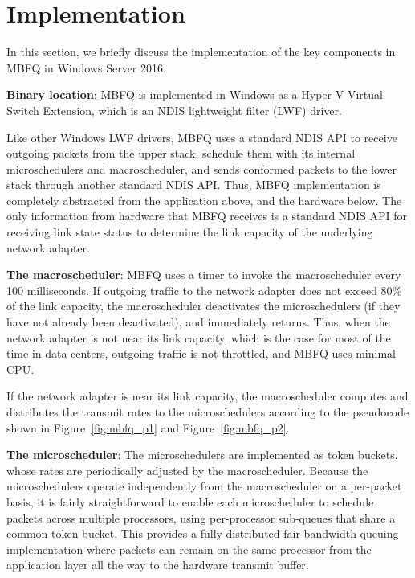 \section{Implementation}
\label{sec:implementation}
In this section, we briefly discuss the implementation of the key components in MBFQ in Windows
Server 2016.

{\bf Binary location}: MBFQ is implemented in Windows as a Hyper-V Virtual Switch Extension, 
which is an NDIS lightweight filter (LWF) driver.

Like other Windows LWF drivers, MBFQ uses a standard NDIS API to receive outgoing packets
from the upper stack, schedule them with its internal microschedulers and macroscheduler, and 
sends conformed packets to the lower stack through another standard NDIS API.
Thus, MBFQ implementation is completely abstracted from the application above, and the 
hardware below.  The only information from hardware that MBFQ receives is a standard NDIS API 
for receiving link state status to determine the link capacity of the underlying network adapter.

{\bf The macroscheduler}: MBFQ uses a timer to invoke the macroscheduler every 100 milliseconds.
If outgoing traffic to the network adapter does not exceed 80\% of the link capacity, the
macroscheduler deactivates the microschedulers (if they have not already been deactivated), and
immediately returns.  Thus, when the network adapter is not near its link capacity, which is the case
for most of the time in data centers, outgoing traffic is not throttled, and MBFQ uses minimal CPU.

If the network adapter is near its link capacity, the macroscheduler computes and distributes the
transmit rates to the microschedulers according to the pseudocode shown in  
Figure~\ref{fig:mbfq_p1} and Figure~\ref{fig:mbfq_p2}.

{\bf The microscheduler}: The microschedulers are implemented as token buckets, whose rates are
periodically adjusted by the macroscheduler. Because the microschedulers operate independently from
the macroscheduler on a per-packet basis, it is fairly straightforward to enable each microscheduler to 
schedule packets across multiple processors, using per-processor sub-queues that share a common 
token bucket. This provides a fully distributed fair bandwidth queuing implementation where packets can remain
on the same processor from the application layer all the way to the hardware transmit buffer.


